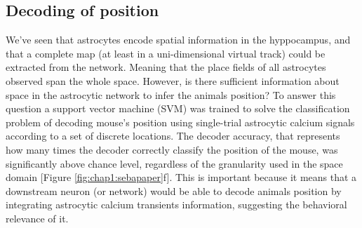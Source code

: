 \subsection{Decoding of position}
\label{chap1:sec:3:subsec2:position_decoding}
We've seen that astrocytes encode spatial information in the hyppocampus, and that a complete map (at least in a uni-dimensional virtual track) could be extracted from the network. Meaning that the place fields of all astrocytes observed span the whole space.
However, is there sufficient information about space in the astrocytic network to infer the animals position? 
To answer this question a support vector machine (SVM) was trained to solve the classification problem of decoding mouse's position using single-trial astrocytic calcium signals according to a set of discrete locations. 
The decoder accuracy, that represents how many times the decoder correctly classify the position of the mouse, was significantly above chance level, regardless of the granularity used in the space domain [Figure \ref{fig:chap1:sebapaper}f]. 
This is important because it means that a downstream neuron (or network) would be able to decode animals position by integrating astrocytic calcium transients information, suggesting the behavioral relevance of it. 





